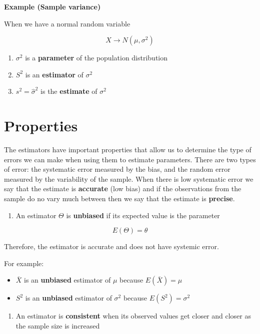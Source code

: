 \documentclass[
]{book}
\providecommand{\tightlist}{%
  \setlength{\itemsep}{0pt}\setlength{\parskip}{0pt}}
\begin{document}
\textbf{Example (Sample variance)}

When we have a normal random variable

\[X \rightarrow N(\mu, \sigma^2)\]

\begin{enumerate}
\def\labelenumi{\arabic{enumi}.}
\tightlist
\item
  \(\sigma^2\) is a \textbf{parameter} of the population distribution
\item
  \(S^2\) is an \textbf{estimator} of \(\sigma^2\)
\item
  \(s^2=\hat{\sigma}^2\) is the \textbf{estimate} of \(\sigma^2\)
\end{enumerate}

\hypertarget{properties}{%
\section{Properties}\label{properties}}

The estimators have important properties that allow us to determine the type of errors we can make when using them to estimate parameters. There are two types of error: the systematic error measured by the bias, and the random error measured by the variability of the sample. When there is low systematic error we say that the estimate is \textbf{accurate} (low bias) and if the observations from the sample do no vary much between then we say that the estimate is \textbf{precise}.

\begin{enumerate}
\def\labelenumi{\arabic{enumi}.}
\tightlist
\item
  An estimator \(\Theta\) is \textbf{unbiased} if its expected value is the parameter
\end{enumerate}

\[E(\Theta)=\theta\]

Therefore, the estimator is accurate and does not have systemic error.

For example:

\begin{itemize}
\item
  \(\bar{X}\) is an \textbf{unbiased} estimator of \(\mu\) because \(E(\bar{X})=\mu\)
\item
  \(S^2\) is an \textbf{unbiased} estimator of \(\sigma^2\) because \(E(S^2)=\sigma^2\)
\end{itemize}

\begin{enumerate}
\def\labelenumi{\arabic{enumi}.}
\setcounter{enumi}{1}
\tightlist
\item
  An estimator is \textbf{consistent} when its observed values get closer and closer as the sample size is increased
\end{enumerate}
\end{document}
